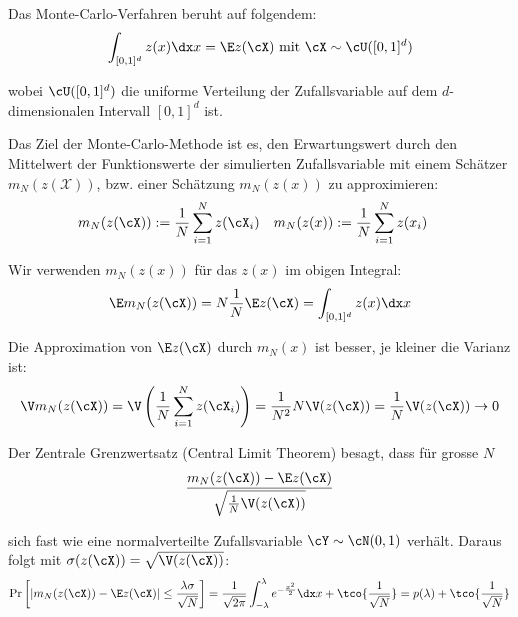 


Das Monte-Carlo-Verfahren beruht auf folgendem:
\rmvspace
\begin{align*}
    \int_{[0, 1]^d} z(x) \dx x = \E z(\cX) \text{ mit } \cX \sim \cU([0, 1]^d)
\end{align*}

\drmvspace
wobei $\cU([0, 1]^d)$ die uniforme Verteilung der Zufallsvariable auf dem $d$-dimensionalen Intervall $[0, 1]^d$ ist.

Das Ziel der Monte-Carlo-Methode ist es, den Erwartungswert durch den Mittelwert der Funktionswerte der simulierten Zufallsvariable mit einem Schätzer $m_N(z(\mathcal{X}))$, bzw. einer Schätzung $m_N(z(x))$ zu approximieren:
\rmvspace
\begin{align*}
    m_N(z(\cX)) & := \frac{1}{N} \sum_{i = 1}^{N} z(\cX_i) &
    m_N(z(x))   & := \frac{1}{N} \sum_{i = 1}^{N} z(x_i)
\end{align*}

\inlineremark Wir verwenden $m_N(z(x))$ für das $z(x)$ im obigen Integral:
\rmvspace
\begin{align*}
    \E m_N(z(\cX)) = N \frac{1}{N} \E z(\cX) = \int_{[0, 1]^d} z(x) \dx x
\end{align*}

\drmvspace
Die Approximation von $\E z(\cX)$ durch $m_N(x)$ ist besser, je kleiner die Varianz ist:
\rmvspace
\begin{align*}
    \V m_N(z(\cX)) = \V \left( \frac{1}{N} \sum_{i = 1}^{N} z(\cX_i) \right) = \frac{1}{N^2} N \V(z(\cX)) = \frac{1}{N} \V(z(\cX)) \rightarrow 0
\end{align*}

\drmvspace
Der Zentrale Grenzwertsatz (Central Limit Theorem) besagt, dass für grosse $N$
\rmvspace
\begin{align*}
    \frac{m_N(z(\cX)) - \E z(\cX)}{\sqrt{\frac{1}{N} \V(z(\cX))}}
\end{align*}

\drmvspace
sich fast wie eine normalverteilte Zufallsvariable $\cY \sim \cN(0, 1)$ verhält.
Daraus folgt mit $\sigma(z(\cX)) = \sqrt{\V(z(\cX))}$:
\rmvspace
\begin{align*}
    \Pr\left[ |m_N(z(\cX)) - \E z(\cX)| \leq \frac{\lambda \sigma}{\sqrt{N}} \right]
    = \frac{1}{\sqrt{2\pi}} \int_{-\lambda}^{\lambda} e^{-\frac{x^2}{2}} \dx x + \tco{\frac{1}{\sqrt{N}}}
    = p(\lambda) + \tco{\frac{1}{\sqrt{N}}}
\end{align*}

